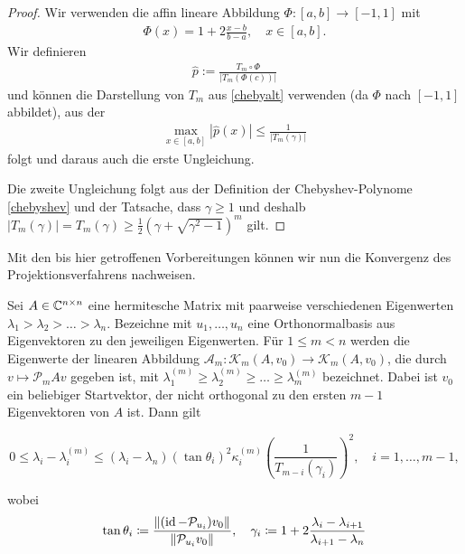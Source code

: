 \documentclass{article}
\begin{document}
\begin{theorem}
\begin{proof}
	Wir verwenden die affin lineare Abbildung $\Phi: [a,b] \to [-1,1]$ mit
	\begin{align*}
		\Phi(x) = 1 + 2 \frac{x-b}{b-a}, \quad x \in [a,b].
	\end{align*}
	Wir definieren
	\begin{align*}
		\hat{p} := \frac{T_m \circ \Phi}{|T_m(\Phi(c))|}
	\end{align*}
	und können die Darstellung von $T_m$ aus \ref{chebyalt} verwenden (da $\Phi$ nach $[-1,1]$ abbildet), aus der
	\begin{align*}
		\max_{x \in [a,b]}|\hat{p}(x)| \leq \frac{1}{|T_m(\gamma)|}
	\end{align*}
	folgt und daraus auch die erste Ungleichung.

	Die zweite Ungleichung folgt aus der Definition der Chebyshev-Polynome \ref{chebyshev} und der Tatsache, dass $\gamma \geq 1$ und deshalb $|T_m(\gamma)| = T_m(\gamma) \geq \frac{1}{2} (\gamma+ \sqrt{\gamma^2-1})^m$ gilt.
\end{proof}

Mit den bis hier getroffenen Vorbereitungen können wir nun die Konvergenz des Projektionsverfahrens nachweisen.

\begin{theorem}
	Sei $A \in \mathbb{C}^{n \times n}$ eine hermitesche Matrix mit paarweise verschiedenen Eigenwerten $\lambda_1 > \lambda_2 > \dots > \lambda_n$. Bezeichne mit $u_1,\dots,u_n$ eine Orthonormalbasis aus Eigenvektoren zu den jeweiligen Eigenwerten. Für $1 \le m < n$ werden die Eigenwerte der linearen Abbildung $\mathcal{A}_m: \mathcal{K}_m(A,v_0)\rightarrow \mathcal{K}_m(A,v_0)$, die durch $v \mapsto \mathcal{P}_mAv$ gegeben ist,  mit $\lambda_1^{(m)} \ge \lambda_2^{(m)} \ge \dots \ge \lambda_m^{(m)}$ bezeichnet. Dabei ist $v_0$ ein beliebiger Startvektor, der nicht orthogonal zu den ersten $m-1$ Eigenvektoren von $A$ ist. Dann gilt

	\begin{equation}
		\label{konvergenz Eigenwerte}
		0 \le \lambda_i - \lambda_i^{(m)} \le (\lambda_i -\lambda_n) (\tan\theta_i)^2 \kappa_i^{(m)} \left(\frac{1}{T_{m-i}(\gamma_i)}\right)^2, \quad i=1,\dots,m-1,
	\end{equation}

	wobei
	\begin{equation*}
		\tan \theta_i \coloneqq \frac{{\left \| (\operatorname{id} - \mathcal{P}_{u_i})v_0 \right \|}_{}}{{\left \|  \mathcal{P}_{u_i}v_0 \right \|}_{}}, \quad \gamma_i \coloneqq 1+2 \frac{\lambda_i-\lambda_{i+1}}{\lambda_{i+1} -\lambda_n}
	\end{equation*}


\end{theorem}
\end{theorem}
\end{document}
